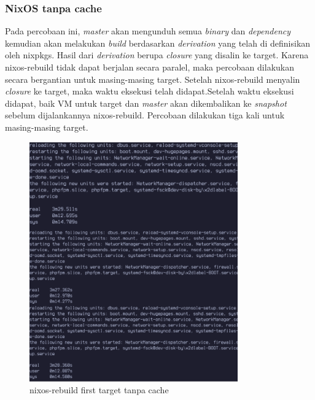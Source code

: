 \documentclass[10pt,twoside]{report}
\begin{document}
\begin{adjustwidth}{20pt}{}
	\subsubsection{NixOS tanpa cache}
	\begin{adjustwidth}{20pt}{}
		Pada percobaan ini, \textit{master} akan mengunduh semua \textit{binary}
		dan \textit{dependency} kemudian akan melakukan \textit{build} berdasarkan
		\textit{derivation} yang telah di definisikan oleh nixpkgs. Hasil dari
		\textit{derivation} berupa \textit{closure} yang disalin ke target. Karena
		nixos-rebuild tidak dapat berjalan secara paralel, maka percobaan dilakukan secara bergantian
		untuk masing-masing target. Setelah nixos-rebuild menyalin \textit{closure}
		ke target, maka waktu eksekusi telah didapat.Setelah waktu eksekusi
		didapat, baik VM untuk target dan \textit{master} akan dikembalikan ke
		\textit{snapshot} sebelum dijalankannya nixos-rebuild. Percobaan dilakukan
		tiga kali untuk masing-masing target.
		\begin{figure}[H]
			\begin{center}
				\includegraphics[width=0.8\textwidth]{images/nix-target/nix-pasca-install-25-com.png}
			\end{center}
			\caption{nixos-rebuild first target tanpa cache}
		\end{figure}
		\begin{figure}[H]
			\begin{center}

\end{center}
\end{figure}
\end{adjustwidth}
\end{adjustwidth}
\end{document}
